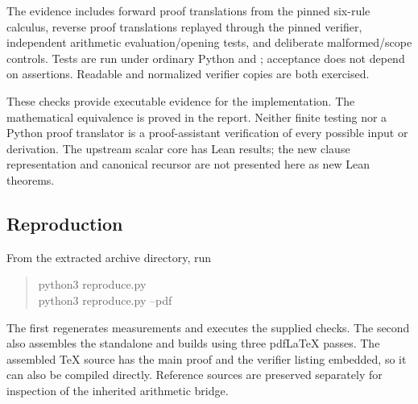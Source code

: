 The evidence includes forward proof translations from the pinned six-rule calculus, reverse proof translations replayed through the pinned verifier, independent arithmetic evaluation/opening tests, and deliberate malformed/scope controls. Tests are run under ordinary Python and ; acceptance does not depend on assertions. Readable and normalized verifier copies are both exercised.

These checks provide executable evidence for the implementation. The mathematical equivalence is proved in the report. Neither finite testing nor a Python proof translator is a proof-assistant verification of every possible input or derivation. The upstream scalar core has Lean results; the new clause representation and canonical recursor are not presented here as new Lean theorems.

\subsection{Reproduction}
From the extracted archive directory, run
\begin{quote}\ttfamily
python3 reproduce.py\\
python3 reproduce.py --pdf
\end{quote}
The first regenerates measurements and executes the supplied checks. The second also assembles the standalone  and builds  using three pdfLaTeX passes. The assembled TeX source has the main proof and the verifier listing embedded, so it can also be compiled directly. Reference sources are preserved separately for inspection of the inherited arithmetic bridge.
